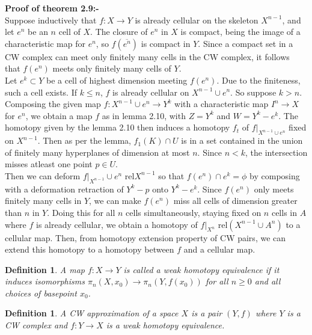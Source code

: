\documentclass[12pt]{extarticle}
\numberwithin{equation}{section}
\newtheorem{defn}[thm]{Definition}
\newenvironment{Proof}[1]
    {\begin{mdframed}\textbf{#1} \\}
    {\end{mdframed}}
\begin{document}
\begin{Proof}{Proof of theorem 2.9:-}
Suppose inductively that $f :X\to Y$ is already cellular on the skeleton
$X^{n-1}$, and let $e^n$ be an $n$ cell of $X$. The closure of $e^n$ in $X$ is compact, being the
image of a characteristic map for $e^n$, so $f(\overline{e^n})$ is compact in $Y$. Since a compact set in a CW complex can meet only finitely many cells in the CW complex, it follows that $f(e^n)$ meets only finitely many cells
of $Y$.\\

Let $e^k \subset Y$ be a cell of highest dimension meeting $f(e^n)$. Due to the finiteness, such a cell exists. If $k\leq n$, $f$ is already cellular on $X^{n-1}\cup e^n$. So suppose $k>n$.\\

Composing the given map $f :X^{n-1}\cup e^n\to Y^k$ with a characteristic map $I^n\to X$ for $e^n$, we obtain a map $f$ as in lemma 2.10, with $Z = Y^k$ and $W = Y^k - e^k$. The homotopy given by the lemma 2.10 then induces a homotopy $f_t$ of $f|_{X^{n-1}\cup e^n}$ fixed on $X^{n-1}$. Then as per the lemma, $f_1(K)\cap U$ is in a set contained in the union of finitely many hyperplanes of dimension at most $n$. Since $n<k$, the intersection misses atleast one point $p\in U$.\\

Then we can deform $f|_{X^{n-1}} \cup e^n$ rel$X^{n-1}$ so that $f(e^n)\cap e^k = \phi$
by composing with a deformation retraction of $Y^k - {p}$ onto $Y^k - e^k$. Since $f(e^n)$ only meets finitely many cells in $Y$, we can make $f(e^n)$ miss all cells of dimension
greater than $n$ in $Y$. Doing this for all $n$ cells simultaneously, staying fixed on $n$ cells
in $A$ where $f$ is already cellular, we obtain a homotopy of $f|_{X^n}$ rel$(X^{n-1} \cup A^n)$ to
a cellular map. Then, from homotopy extension property of CW pairs, we can extend this homotopy to a homotopy between $f$ and a cellular map.\\

\end{Proof}


\begin{defn}
A map $f :X\to Y$ is called a weak homotopy equivalence if it induces isomorphisms $\pi_n(X,x_0)\to\pi_n(Y,f(x_0))$ for all $n \geq 0$ and all choices of basepoint $x_0$.
\end{defn}

\begin{defn}
A CW approximation of a space $X$ is a pair $(Y,f)$ where $Y$ is a CW complex and $f:Y \to X$ is a weak homotopy equivalence.
\end{defn}
\end{document}
